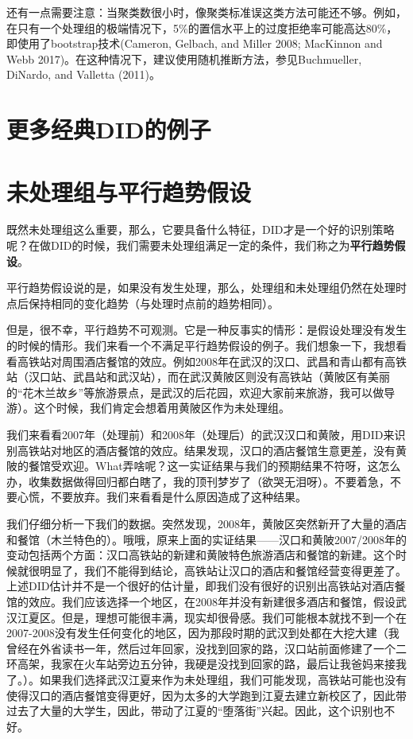 \documentclass[cn,12pt,math=newtx,citestyle=gb7714-2015,bibstyle=gb7714-2015]{elegantbook}
\begin{document}
还有一点需要注意：当聚类数很小时，像聚类标准误这类方法可能还不够。例如，在只有一个处理组的极端情况下，5\%的置信水平上的过度拒绝率可能高达80\%，即使用了bootstrap技术(Cameron, Gelbach, and Miller 2008; MacKinnon and Webb 2017)。在这种情况下，建议使用随机推断方法，参见Buchmueller, DiNardo, and Valletta (2011)。


	
	\section{更多经典DID的例子}
	
	
	
	\section{未处理组与平行趋势假设}
	
	既然未处理组这么重要，那么，它要具备什么特征，DID才是一个好的识别策略呢？在做DID的时候，我们需要未处理组满足一定的条件，我们称之为\textbf{平行趋势假设}。
	
	平行趋势假设说的是，如果没有发生处理，那么，处理组和未处理组仍然在处理时点后保持相同的变化趋势（与处理时点前的趋势相同）。
	
	但是，很不幸，平行趋势不可观测。它是一种反事实的情形：是假设处理没有发生的时候的情形。我们来看一个不满足平行趋势假设的例子。我们想象一下，我想看看高铁站对周围酒店餐馆的效应。例如2008年在武汉的汉口、武昌和青山都有高铁站（汉口站、武昌站和武汉站），而在武汉黄陂区则没有高铁站（黄陂区有美丽的“花木兰故乡”等旅游景点，是武汉的后花园，欢迎大家前来旅游，我可以做导游）。这个时候，我们肯定会想着用黄陂区作为未处理组。
	
	我们来看看2007年（处理前）和2008年（处理后）的武汉汉口和黄陂，用DID来识别高铁站对地区的酒店餐馆的效应。结果发现，汉口的酒店餐馆生意更差，没有黄陂的餐馆受欢迎。What弄啥呢？这一实证结果与我们的预期结果不符呀，这怎么办，收集数据做得回归都白瞎了，我的顶刊梦岁了（欲哭无泪呀）。不要着急，不要心慌，不要放弃。我们来看看是什么原因造成了这种结果。
	
	我们仔细分析一下我们的数据。突然发现，2008年，黄陂区突然新开了大量的酒店和餐馆（木兰特色的）。哦哦，原来上面的实证结果——汉口和黄陂2007/2008年的变动包括两个方面：汉口高铁站的新建和黄陂特色旅游酒店和餐馆的新建。这个时候就很明显了，我们不能得到结论，高铁站让汉口的酒店和餐馆经营变得更差了。上述DID估计并不是一个很好的估计量，即我们没有很好的识别出高铁站对酒店餐馆的效应。我们应该选择一个地区，在2008年并没有新建很多酒店和餐馆，假设武汉江夏区。但是，理想可能很丰满，现实却很骨感。我们可能根本就找不到一个在2007-2008没有发生任何变化的地区，因为那段时期的武汉到处都在大挖大建（我曾经在外省读书一年，然后过年回家，没找到回家的路，汉口站前面修建了一个二环高架，我家在火车站旁边五分钟，我硬是没找到回家的路，最后让我爸妈来接我了。）。如果我们选择武汉江夏来作为未处理组，我们可能发现，高铁站可能也没有使得汉口的酒店餐馆变得更好，因为太多的大学跑到江夏去建立新校区了，因此带过去了大量的大学生，因此，带动了江夏的“堕落街”兴起。因此，这个识别也不好。
	
\end{document}
